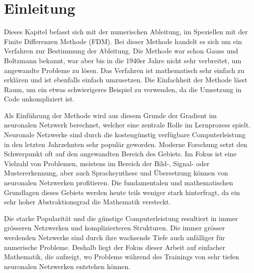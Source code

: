 %
%
%
\section{Einleitung\label{ableitung:section:einleitung}}
Dieses Kapitel befasst sich mit der numerischen Ableitung, im Speziellen mit der Finite Differenzen Methode (FDM).
Bei dieser Methode handelt es sich um ein Verfahren zur Bestimmung der Ableitung. Die Methode war schon Gauss und Boltzmann bekannt, war aber bis in die 1940er Jahre nicht sehr verbreitet, um angewandte Probleme zu lösen. Das Verfahren ist mathematisch sehr einfach zu erklären und ist ebenfalls einfach umzusetzen. Die Einfachheit der Methode lässt Raum, um ein etwas schwierigeres Beispiel zu verwenden, da die Umsetzung in Code unkompliziert ist.

Als Einführung der Methode wird aus diesem Grunde der Gradient im neuronalen Netzwerk berechnet, welcher eine zentrale Rolle im Lernprozess spielt.
Neuronale Netzwerke sind durch die kostengünstig verfügbare Computerleistung in den letzten Jahrzehnten sehr populär geworden. Moderne Forschung setzt den Schwerpunkt oft auf den angewandten Bereich des Gebiets. Im Fokus ist eine Vielzahl von Problemen, meistens im Bereich der Bild-, Signal- oder Mustererkennung, aber auch Sprachsynthese und Übersetzung können von neuronalen Netzwerken profitieren. Die fundamentalen und mathematischen Grundlagen dieses Gebiets werden heute teils weniger stark hinterfragt, da ein sehr hoher Abstraktionsgrad die Mathematik versteckt.

Die starke Popularität und die günstige Computerleistung resultiert in immer grösseren Netzwerken und komplizierteren Strukturen. Die immer grösser werdenden Netzwerke sind durch ihre wachsende Tiefe auch anfälliger für numerische Probleme. Deshalb liegt der Fokus dieser Arbeit auf einfacher Mathematik, die aufzeigt, wo Probleme während des Trainings von sehr tiefen neuronalen Netzwerken entstehen können.